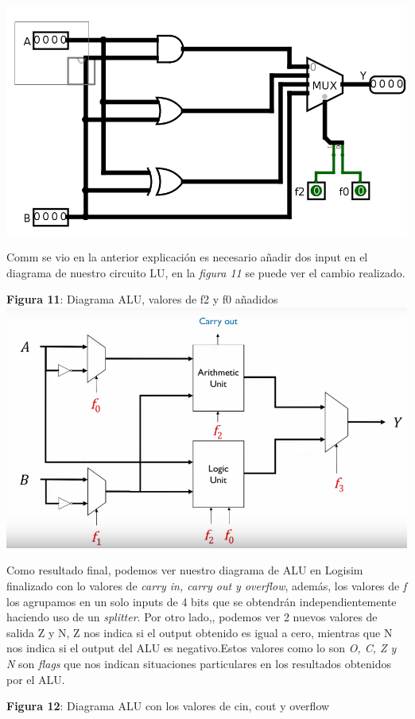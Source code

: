\documentclass[11pt]{article}
\begin{document}
\begin{question}
{\begin{center}
		\includegraphics[scale=0.3]{IMAGES_12}
	\end{center}
	Comm se  vio en la anterior explicación es necesario añadir dos input en el diagrama de nuestro circuito LU, en la \emph{figura 11} se puede ver el cambio realizado.
	\begin{center} \textbf{Figura 11}: Diagrama ALU, valores  de f2 y f0 añadidos 
		\includegraphics[scale=0.3]{IMAGES_10}
	\end{center}
	Como resultado final, podemos ver nuestro diagrama de ALU en Logisim finalizado con lo valores de \textit{carry in, carry out y overflow}, además, los valores de \textit{f} los agrupamos en un solo inputs de 4 bits que se obtendrán independientemente haciendo uso de un \textit{splitter}. Por otro lado,,  podemos ver 2 nuevos valores de salida Z y N, Z nos indica si el output obtenido es igual a cero, mientras que N nos indica si el output del ALU es negativo.Estos valores como lo son \textit{O, C, Z y N} son \textit{flags} que nos indican situaciones particulares en los resultados obtenidos por el ALU.
	\begin{center} \textbf{Figura 12}: Diagrama ALU con los valores de cin, cout y overflow 

\end{center}}
\end{question}
\end{document}
